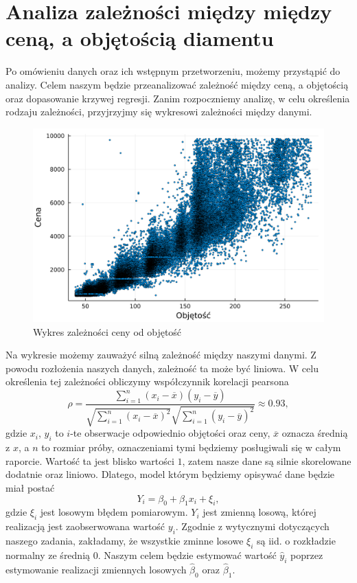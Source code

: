 \documentclass[12pt]{article}
\theoremstyle{exer}
\begin{document}
	\section{Analiza zależności między między ceną, a objętością diamentu}
	Po omówieniu danych oraz ich wstępnym przetworzeniu, możemy przystąpić do analizy. Celem naszym będzie przeanalizować zależność między ceną, a objętością oraz dopasowanie krzywej regresji. Zanim rozpoczniemy analizę, w celu określenia rodzaju zależności, przyjrzyjmy się wykresowi zależności między danymi. %
	\begin{figure}[H]\label{fig:v_vs_price}\centering
		\includegraphics[width=4\columnwidth/5]{images/Budnik/v_vs_price.png}\caption{Wykres zależności ceny od objętość}
	\end{figure}
	\noindent Na wykresie możemy zauważyć silną zależność między naszymi danymi. Z powodu rozłożenia naszych danych, zależność ta może być liniowa. W celu określenia tej zależności obliczymy współczynnik korelacji pearsona
	\begin{equation}
		\rho=\frac{\sum_{i=1}^n\left(x_i-\overline{x}\right)\left(y_i-\overline{y}\right)}
		{\sqrt{\sum_{i=1}^n\left(x_i-\overline{x}\right)^2}\sqrt{\sum_{i=1}^n\left(y_i-\overline{y}\right)^2}}\approx0.93,
	\end{equation}
	gdzie $x_i$, $y_i$ to $i$-te obserwacje odpowiednio objętości oraz ceny, $\overline{x}$ oznacza średnią z $x$, a $n$ to rozmiar próby, oznaczeniami tymi będziemy posługiwali się w całym raporcie. Wartość ta jest blisko wartości $1$, zatem nasze dane są silnie skorelowane dodatnie oraz liniowo. Dlatego, model którym będziemy opisywać dane będzie miał postać
	\begin{equation}\label{eq:reg}
		Y_i=\beta_0+\beta_1x_i+\xi_i,
	\end{equation}
	gdzie $\xi_i$ jest losowym błędem pomiarowym. $Y_i$ jest zmienną losową, której realizacją jest zaobserwowana wartość $y_i$. Zgodnie z wytycznymi dotyczących naszego zadania, zakładamy, że wszystkie zminne losowe $\xi_i$ są iid. o rozkładzie normalny ze średnią 0. Naszym celem będzie estymować wartość $\hat y_i$ poprzez estymowanie realizacji zmiennych losowych $\hat \beta_0$ oraz $\hat\beta_1$.
\end{document}
